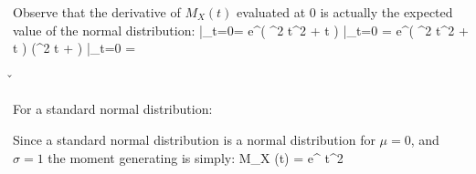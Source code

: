 Observe that the derivative of $M_{X} (t)$ evaluated at 0 is actually the expected value of the normal distribution:
\bse
{} \bigg|_{t=0}=  e^{( \sigma^2 t^2 + t \mu)} \bigg|_{t=0}
= e^{( \sigma^2 t^2 + t \mu)} \cdot (\sigma^2 t + \mu) \bigg|_{t=0} = \mu
\ese

\v

\item For a standard normal distribution:

Since a standard normal distribution is a normal distribution for $\mu = 0$, and $\sigma =1$ the moment generating is
simply:
\bse
M_{X} (t) = e^{ t^2}
\ese
\eit
